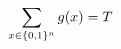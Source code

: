 \documentclass[preview]{standalone}
\begin{document}
\begin{align*}
\special{dvisvgm:raw <g id='unique000'>}\sum_{x \in \{0,1\}^n} g(x) = T\special{dvisvgm:raw </g>}
\end{align*}
\end{document}
